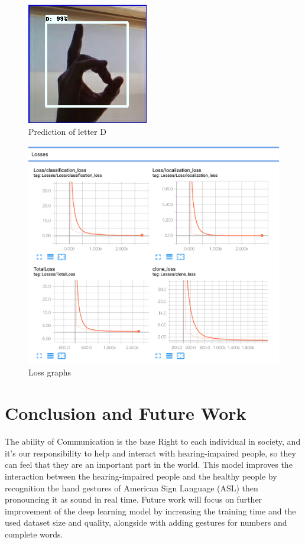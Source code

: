 \documentclass[12pt]{report}
\begin{document}
\begin{figure}[h]
    \centering
    \includegraphics[width=.6\textwidth]{./images/d_eval.png}
    \caption{Prediction of letter D}
    \label{fig:d_eval}
\end{figure} 

\begin{figure}
    \centering
    \includegraphics[width=\textwidth]{./images/loss.png}
    \caption{Loss graphs}
    \label{fig:loss}
\end{figure}

\chapter{Conclusion and Future Work}
The ability of Communication is the base Right to each individual in society,
and it's our responsibility to help and interact with hearing-impaired people,
so they can feel that they are an important part in the world.
This model improves the interaction between the hearing-impaired people 
and the healthy people by recognition the hand gestures of American Sign Language (ASL)
then pronouncing it as sound in real time. Future work will focus on 
further improvement of the deep learning model by increasing the training time 
and the used dataset size and quality, alongside with adding gestures for numbers 
and complete words.
\renewcommand\bibname{References}            


\end{document}
